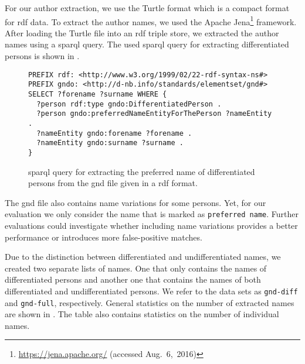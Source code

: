 For our author extraction, we use the Turtle format which is a compact format for \gls{rdf} data.
To extract the author names, we used the Apache Jena\footnote{\url{https://jena.apache.org/} (accessed Aug.~6,~2016)} framework.
After loading the Turtle file into an \gls{rdf} triple store, we extracted the author names using a \gls{sparql} query.
The used \gls{sparql} query for extracting differentiated persons is shown in .
\begin{figure}[t]
\begin{lstlisting}[basicstyle=\ttfamily]
PREFIX rdf: <http://www.w3.org/1999/02/22-rdf-syntax-ns#>
PREFIX gndo: <http://d-nb.info/standards/elementset/gnd#>
SELECT ?forename ?surname WHERE {
  ?person rdf:type gndo:DifferentiatedPerson .
  ?person gndo:preferredNameEntityForThePerson ?nameEntity .
  ?nameEntity gndo:forename ?forename .
  ?nameEntity gndo:surname ?surname .
}
\end{lstlisting}
\caption{\gls{sparql} query for extracting the preferred name of differentiated persons from the \gls{gnd} file given in a \gls{rdf} format.}
\label{fig:gnd-sparql-query}
\end{figure}
The \gls{gnd} file also contains name variations for some persons.
Yet, for our evaluation we only consider the name that is marked as \texttt{preferred name}.
Further evaluations could investigate whether including name variations provides a better performance or introduces more false-positive matches.

Due to the distinction between differentiated and undifferentiated names, we created two separate lists of names.
One that only contains the names of differentiated persons and another one that contains the names of both differentiated and undifferentiated persons.
We refer to the data sets as \texttt{gnd-diff} and \texttt{gnd-full}, respectively.
General statistics on the number of extracted names are shown in .
The table also contains statistics on the number of individual names.

